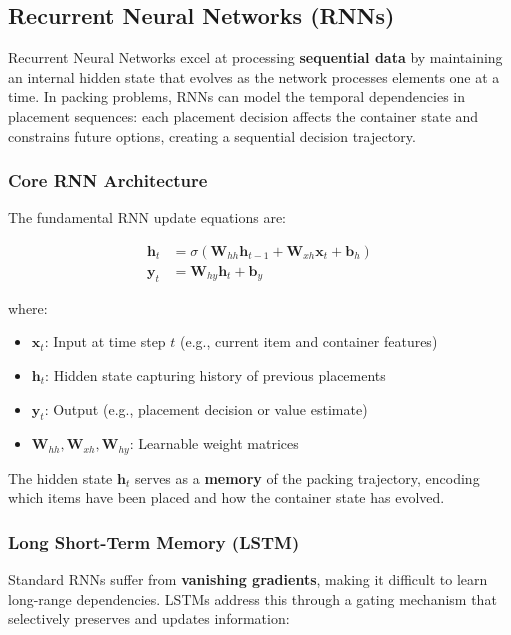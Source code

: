 \subsection{Recurrent Neural Networks (RNNs)}

Recurrent Neural Networks excel at processing \textbf{sequential data} by maintaining an internal hidden state that evolves as the network processes elements one at a time. In packing problems, RNNs can model the temporal dependencies in placement sequences: each placement decision affects the container state and constrains future options, creating a sequential decision trajectory.

\subsubsection{Core RNN Architecture}

The fundamental RNN update equations are:

\begin{align}
\mathbf{h}_t &= \sigma(\mathbf{W}_{hh} \mathbf{h}_{t-1} + \mathbf{W}_{xh} \mathbf{x}_t + \mathbf{b}_h) \\
\mathbf{y}_t &= \mathbf{W}_{hy} \mathbf{h}_t + \mathbf{b}_y
\end{align}

where:
\begin{itemize}
\item $\mathbf{x}_t$: Input at time step $t$ (e.g., current item and container features)
\item $\mathbf{h}_t$: Hidden state capturing history of previous placements
\item $\mathbf{y}_t$: Output (e.g., placement decision or value estimate)
\item $\mathbf{W}_{hh}, \mathbf{W}_{xh}, \mathbf{W}_{hy}$: Learnable weight matrices
\end{itemize}

The hidden state $\mathbf{h}_t$ serves as a \textbf{memory} of the packing trajectory, encoding which items have been placed and how the container state has evolved.

\subsubsection{Long Short-Term Memory (LSTM)}

Standard RNNs suffer from \textbf{vanishing gradients}, making it difficult to learn long-range dependencies. LSTMs address this through a gating mechanism that selectively preserves and updates information:

